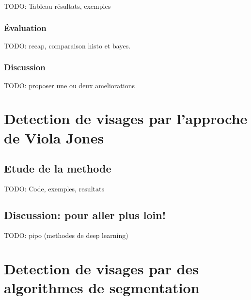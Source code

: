 \documentclass{article}
\begin{document}
TODO: Tableau résultats, exemples

\subsubsection{Évaluation}

TODO: recap, comparaison histo et bayes. 

\subsubsection{Discussion}

TODO: proposer une ou deux ameliorations

\section{Detection de visages par l'approche de Viola Jones}
\subsection{Etude de la methode}
TODO: Code, exemples, resultats

\subsection{Discussion: pour aller plus loin!}
TODO: pipo (methodes de deep learning)

\section{Detection de visages par des algorithmes de segmentation}
\end{document}

